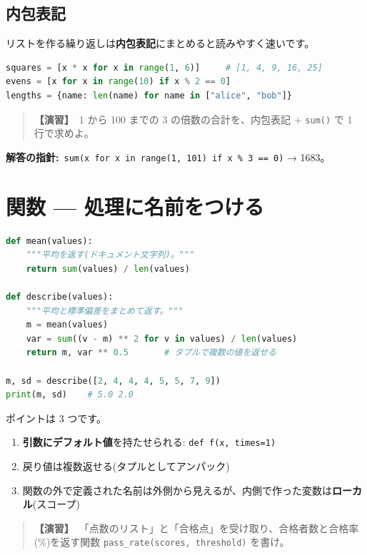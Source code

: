 \documentclass{article}
\begin{document}
\subsection{内包表記}

リストを作る繰り返しは\textbf{内包表記}にまとめると読みやすく速いです。

\begin{lstlisting}[language=Python]
squares = [x * x for x in range(1, 6)]     # [1, 4, 9, 16, 25]
evens = [x for x in range(10) if x % 2 == 0]
lengths = {name: len(name) for name in ["alice", "bob"]}
\end{lstlisting}

\begin{quote}
\textbf{【演習】}\ 1 から 100 までの 3 の倍数の合計を、内包表記 + \texttt{sum()} で 1 行で求めよ。
\end{quote}

\textbf{解答の指針:}\ \texttt{sum(x for x in range(1, 101) if x \% 3 == 0)} → 1683。

\section{関数 — 処理に名前をつける}

\begin{lstlisting}[language=Python]
def mean(values):
    """平均を返す(ドキュメント文字列)。"""
    return sum(values) / len(values)

def describe(values):
    """平均と標準偏差をまとめて返す。"""
    m = mean(values)
    var = sum((v - m) ** 2 for v in values) / len(values)
    return m, var ** 0.5       # タプルで複数の値を返せる

m, sd = describe([2, 4, 4, 4, 5, 5, 7, 9])
print(m, sd)    # 5.0 2.0
\end{lstlisting}

ポイントは 3 つです。

\begin{enumerate}
\item \textbf{引数にデフォルト値}を持たせられる: \texttt{def f(x, times=1)}
\item 戻り値は複数返せる(タプルとしてアンパック)
\item 関数の外で定義された名前は外側から見えるが、内側で作った変数は\textbf{ローカル}(スコープ)
\end{enumerate}

\begin{quote}
\textbf{【演習】}\ 「点数のリスト」と「合格点」を受け取り、合格者数と合格率(\%)を返す関数 \texttt{pass\_rate(scores, threshold)} を書け。
\end{quote}
\end{document}
